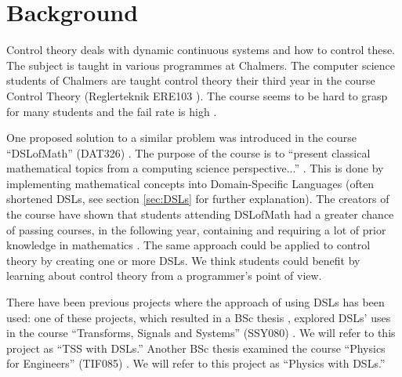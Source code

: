 \newpage

\section{Background}

\iffalse
This project aims to develop supplementary learning material for the subject Control Theory, using domain-specific languages. Specifically, it will focus on the course ``Reglerteknik'' (\textit{ERE103}), which computer science students enrol at Chalmers in their third year of study. ERE103 is a course that is hard to grasp for many students and should benefit from a programming approach. The course Domain Specific Languages of Mathematics (course code \textit{DAT326/DIT982}, henceforth called ``DSLsofmath''), is the inspiration for this project. 
\fi


Control theory deals with dynamic continuous systems and how to control these. The subject is taught in various programmes at Chalmers. The computer science students of Chalmers are taught control theory their third year in the course Control Theory (Reglerteknik ERE103 \cite{ERE103}). The course seems to be hard to grasp for many students and the fail rate is high \cite{exam_stat_regler}.

One proposed solution to a similar problem was introduced in the course “DSLofMath” (DAT326) \cite{DAT326}. The purpose of the course is to ``present classical mathematical topics from a computing science perspective...'' \cite{DAT326}. This is done by implementing mathematical concepts into Domain-Specific Languages (often shortened DSLs, see section \ref{sec:DSLs} for further explanation). The creators of the course have shown that students attending DSLofMath had a greater chance of passing courses, in the following year, containing and requiring a lot of prior knowledge in mathematics \cite{DSLofMathResults}. The same approach could be applied to control theory by creating one or more DSLs. We think students could benefit by learning about control theory from a programmer’s point of view.

There have been previous projects where the approach of using DSLs has been used: one of these projects, which resulted in a BSc thesis \cite{tssarbete}, explored DSLs' uses in the course ``Transforms, Signals and Systems'' (SSY080) \cite{SSY080}. We will refer to this project as ``TSS with DSLs.''
Another BSc thesis \cite{fysikarbete} examined the course ``Physics for Engineers'' (TIF085) \cite{TIF085}. We will refer to this project as ``Physics with DSLs.''

